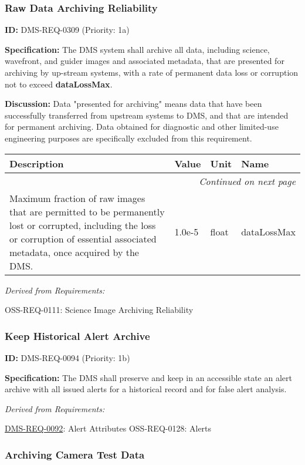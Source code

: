 \documentclass[SE,toc,lsstdraft]{lsstdoc}
\makeatletter
\newcommand{\paramname}[1]{\hspace{0pt}#1}
\newcommand{\unitname}[1]{\hspace{0pt}#1}
\newenvironment{parameters}[0]{%
\setlength\LTleft{0pt}
\setlength\LTright{\fill}
\begin{small}
\begin{longtable}[]{|p{0.49\textwidth}|l|p{0.6in}|p{1.70in}@{}|}

\hline \textbf{Description} & \textbf{Value} & \textbf{Unit} & \textbf{Name} \\ \hline
\endhead

\hline \multicolumn{4}{r}{\emph{Continued on next page}} \\
\endfoot

\hline\hline
\endlastfoot
}{%
\hline
\end{longtable}
\end{small}
}
\makeatother
\begin{document}
\subsubsection{Raw Data Archiving Reliability}

\label{DMS-REQ-0309}
\textbf{ID:} DMS-REQ-0309 (Priority: 1a)

\textbf{Specification:}
    The DMS system shall archive all data, including science, wavefront, and guider images and associated metadata, that are presented for archiving by up-stream systems, with a rate of permanent data loss or corruption not to exceed \textbf{dataLossMax}.

\textbf{Discussion:}
Data "presented for archiving" means data that have been successfully transferred from upstream systems to DMS, and that are intended for permanent archiving. Data obtained for diagnostic and other limited-use engineering purposes are specifically excluded from this requirement.

\begin{parameters}
Maximum fraction of raw images that are permitted to be permanently lost or corrupted, including the loss or corruption of essential associated metadata, once acquired by the DMS.
&
1.0e-5
&
\unitname{%
float
}
&
\paramname{%
dataLossMax
} \\\hline
\end{parameters}

\emph{Derived from Requirements:}

OSS-REQ-0111:
Science Image Archiving Reliability \newline

\subsubsection{Keep Historical Alert Archive}

\label{DMS-REQ-0094}
\textbf{ID:} DMS-REQ-0094 (Priority: 1b)

\textbf{Specification: }The DMS shall preserve and keep in an accessible state an alert archive with all issued alerts for a historical record and for false alert analysis.

\emph{Derived from Requirements:}

\hyperref[DMS-REQ-0092]{DMS-REQ-0092}:
Alert Attributes \newline
OSS-REQ-0128:
Alerts \newline

\subsubsection{Archiving Camera Test Data}
\end{document}
